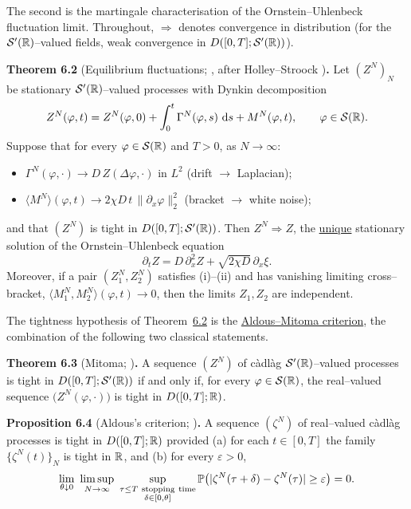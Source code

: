 \documentclass[11pt]{article}
\theoremstyle{plain}
\theoremstyle{definition}
\theoremstyle{remark}
\newcommand{\To}{\Rightarrow}\newcommand{\so}{\mathfrak{so}}
\begin{document}
\noindent The second is the martingale characterisation of the Ornstein--Uhlenbeck
fluctuation limit. Throughout, $\To$ denotes convergence in distribution (for the
$\mathcal S'(\mathbb{R})$--valued fields, weak convergence in $D([0,T];\mathcal S'(\mathbb{R}))$).

\label{thm_mp}\noindent\textbf{Theorem 6.2} (Equilibrium fluctuations; {\cite[Ch.~11]{KL}}, after Holley--Stroock \cite{HolleyStroock})\textbf{.} 
Let $(Z^N)_N$ be stationary $\mathcal S'(\mathbb{R})$--valued processes with Dynkin decomposition
\[
  Z^N(\varphi,t)=Z^N(\varphi,0)+\int_0^t\Gamma^N(\varphi,s)\,\,\mathrm{d} s+M^N(\varphi,t),
  \qquad \varphi\in\mathcal S(\mathbb{R}).
\]
Suppose that for every $\varphi\in\mathcal S(\mathbb{R})$ and $T>0$, as $N\to\infty$:
\begin{itemize}
\item[\textup{(i)}] $\Gamma^N(\varphi,\cdot)\to D\,Z(\Delta\varphi,\cdot)$ in $L^2$
  \quad(drift $\to$ Laplacian);
\item[\textup{(ii)}] $\langle M^N\rangle(\varphi,t)\to 2\chi D\,t\,\|\partial_x\varphi\|_2^2$
  \quad(bracket $\to$ white noise);
\end{itemize}
and that $(Z^N)$ is tight in $D([0,T];\mathcal S'(\mathbb{R}))$. Then $Z^N\To Z$, the \underline{unique}
stationary solution of the Ornstein--Uhlenbeck equation
\[
  \partial_t Z=D\,\partial_x^2 Z+\sqrt{2\chi D}\,\partial_x\xi .
\]
Moreover, if a pair $(Z_1^N,Z_2^N)$ satisfies \textup{(i)--(ii)} and has vanishing
limiting cross--bracket, $\langle M_1^N,M_2^N\rangle(\varphi,t)\to0$, then the limits
$Z_1,Z_2$ are independent.
\par

\noindent The tightness hypothesis of Theorem~\hyperref[thm_mp]{6.2} is the \underline{Aldous--Mitoma
criterion}, the combination of the following two classical statements.

\label{thm_mitoma}\noindent\textbf{Theorem 6.3} (Mitoma; \cite{Mitoma})\textbf{.} 
A sequence $(Z^N)$ of c\`adl\`ag $\mathcal S'(\mathbb{R})$--valued processes is tight in
$D([0,T];\mathcal S'(\mathbb{R}))$ if and only if, for every $\varphi\in\mathcal S(\mathbb{R})$, the real--valued
sequence $\big(Z^N(\varphi,\cdot)\big)$ is tight in $D([0,T];\mathbb{R})$.
\par

\label{prop_aldous}\noindent\textbf{Proposition 6.4} (Aldous's criterion; \cite{Aldous})\textbf{.} 
A sequence $(\zeta^N)$ of real--valued c\`adl\`ag processes is tight in $D([0,T];\mathbb{R})$
provided \textup{(a)} for each $t\in[0,T]$ the family $\{\zeta^N(t)\}_N$ is tight in
$\mathbb{R}$, and \textup{(b)} for every $\varepsilon>0$,
\[
  \lim_{\theta\downarrow0}\ \limsup_{N\to\infty}\
  \sup_{\substack{\tau\le T\ \mathrm{stopping\ time}\\ \delta\in[0,\theta]}}
  \PP\big(|\zeta^N(\tau+\delta)-\zeta^N(\tau)|\ge\varepsilon\big)=0 .
\]
\par
\end{document}

